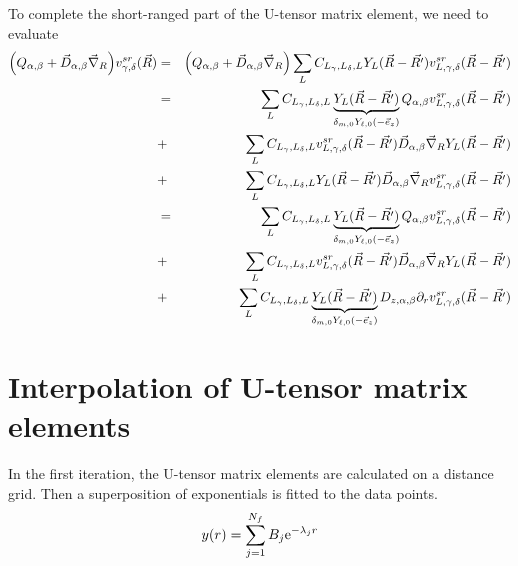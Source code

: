 \documentclass[11pt,a4paper]{report}
\begin{document}
To complete the short-ranged part of the U-tensor matrix element, we
need to evaluate
\begin{eqnarray}
\Bigl(Q_{\alpha,\beta}+\vec{D}_{\alpha,\beta}
\vec{\nabla}_R\Bigr)v^{sr}_{\gamma,\delta}(\vec{R})
&=&\Bigl(Q_{\alpha,\beta}+\vec{D}_{\alpha,\beta}
\vec{\nabla}_R\Bigr)\sum_L 
C_{L_\gamma,L_\delta,L}Y_L(\vec{R}-\vec{R'})
v_{L,\gamma,\delta}^{sr}(\vec{R}-\vec{R'})
\nonumber\\
&=&
\sum_L C_{L_\gamma,L_\delta,L}\underbrace{
Y_L(\vec{R}-\vec{R'})
}_{\delta_{m,0}Y_{\ell,0}(-\vec{e}_z)}
Q_{\alpha,\beta}v_{L,\gamma,\delta}^{sr}(\vec{R}-\vec{R'})
\nonumber\\
&+&
\sum_L 
C_{L_\gamma,L_\delta,L}
v_{L,\gamma,\delta}^{sr}(\vec{R}-\vec{R'})
\vec{D}_{\alpha,\beta}\vec{\nabla}_RY_L(\vec{R}-\vec{R'})
\nonumber\\
&+&
\sum_L 
C_{L_\gamma,L_\delta,L}Y_L(\vec{R}-\vec{R'})
\vec{D}_{\alpha,\beta}
\vec{\nabla}_R
v_{L,\gamma,\delta}^{sr}(\vec{R}-\vec{R'})
\nonumber\\
&=&
\sum_L C_{L_\gamma,L_\delta,L}\underbrace{
Y_L(\vec{R}-\vec{R'})
}_{\delta_{m,0}Y_{\ell,0}(-\vec{e}_z)}
Q_{\alpha,\beta}v_{L,\gamma,\delta}^{sr}(\vec{R}-\vec{R'})
\nonumber\\
&+&
\sum_L 
C_{L_\gamma,L_\delta,L}
v_{L,\gamma,\delta}^{sr}(\vec{R}-\vec{R'})
\vec{D}_{\alpha,\beta}
\vec{\nabla}_RY_L(\vec{R}-\vec{R'})
\nonumber\\
&+&
\sum_L 
C_{L_\gamma,L_\delta,L}
\underbrace{
Y_L(\vec{R}-\vec{R'})
}_{\delta_{m,0}Y_{\ell,0}(-\vec{e}_z)}
D_{z,\alpha,\beta}
\partial_r v_{L,\gamma,\delta}^{sr}(\vec{R}-\vec{R'})
\nonumber\\
\end{eqnarray}

\chapter{Interpolation of U-tensor matrix elements}

In the first iteration, the U-tensor matrix elements are calculated on
a distance grid. Then a superposition of exponentials is fitted to the
data points.
\begin{eqnarray}
y(r)=\sum_{j=1}^{N_f} B_j\mathrm{e}^{-\lambda_jr}
\end{eqnarray}
\end{document}
